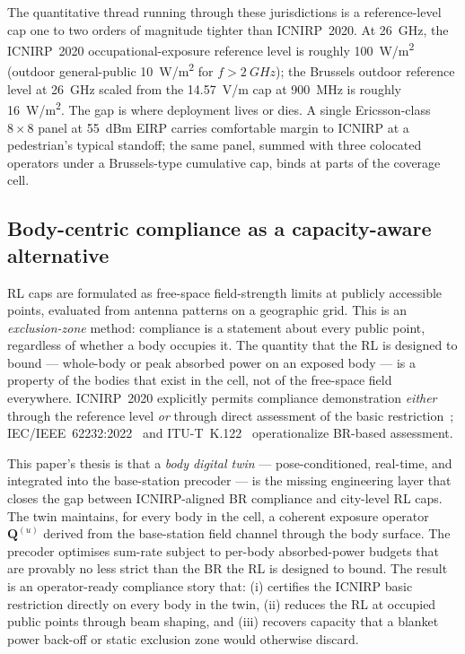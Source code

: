 \documentclass[journal,twoside,onecolumn]{IEEEtran}
\theoremstyle{definition}
\newcommand{\Q}{\mathbf{Q}}
\begin{document}
The quantitative thread running through these jurisdictions is a
reference-level cap one to two orders of magnitude tighter than
ICNIRP~2020. At 26~GHz, the ICNIRP~2020 occupational-exposure
reference level is roughly 100~W/m\textsuperscript{2} (outdoor
general-public \SI{10}{W/m^2} for $f>\SI{2}{GHz}$); the Brussels
outdoor reference level at 26~GHz scaled from the 14.57~V/m cap at
900~MHz is roughly \SI{16}{W/m^2}. The gap is where deployment
lives or dies. A single Ericsson-class $8{\times}8$ panel at
55~dBm EIRP carries comfortable margin to ICNIRP at a pedestrian's
typical standoff; the same panel, summed with three colocated
operators under a Brussels-type cumulative cap, binds at parts of
the coverage cell.

\subsection{Body-centric compliance as a capacity-aware alternative}

RL caps are formulated as free-space field-strength limits at
publicly accessible points, evaluated from antenna patterns on a
geographic grid. This is an \emph{exclusion-zone} method:
compliance is a statement about every public point, regardless of
whether a body occupies it. The quantity that the RL is designed
to bound --- whole-body or peak absorbed power on an exposed
body --- is a property of the bodies that exist in the cell, not of
the free-space field everywhere. ICNIRP~2020 explicitly permits
compliance demonstration \emph{either} through the reference level
\emph{or} through direct assessment of the basic
restriction~\cite{ICNIRP2020}; IEC/IEEE~62232:2022~\cite{IEC62232}
and ITU-T~K.122~\cite{K122} operationalize BR-based assessment.

This paper's thesis is that a \emph{body digital twin} ---
pose-conditioned, real-time, and integrated into the base-station
precoder --- is the missing engineering layer that closes the gap
between ICNIRP-aligned BR compliance and city-level RL caps. The
twin maintains, for every body in the cell, a coherent
exposure operator $\Q^{(u)}$ derived from the base-station field
channel through the body surface. The precoder optimises sum-rate
subject to per-body absorbed-power budgets that are provably no
less strict than the BR the RL is designed to bound. The result is
an operator-ready compliance story that: (i) certifies the ICNIRP
basic restriction directly on every body in the twin, (ii) reduces
the RL at occupied public points through beam shaping, and (iii)
recovers capacity that a blanket power back-off or static
exclusion zone would otherwise discard.
\end{document}
